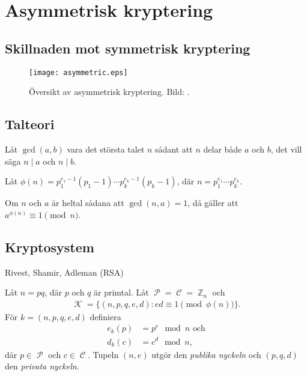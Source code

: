 \documentclass{beamer}
\theoremstyle{definition}
\DeclareMathOperator{\p}{\mathcal{P}}
\let\P\p
\DeclareMathOperator{\C}{\mathcal{C}}
\DeclareMathOperator{\K}{\mathcal{K}}
\DeclareMathOperator{\Z}{\mathbb{Z}}
\let\stoch\mathbf
\renewcommand{\p}{\stoch P}
\begin{document}
\section{Asymmetrisk kryptering}

\subsection{Skillnaden mot symmetrisk kryptering}

\begin{frame}{\insertsubsectionhead}
  \begin{figure}
    \texttt{[image: asymmetric.eps]}
    \caption{Översikt av asymmetrisk kryptering.
    Bild: \cite{Stallings2011can}.}
  \end{figure}
\end{frame}

\subsection{Talteori}

\begin{frame}{\insertsubsectionhead}
  \begin{definition}
    Låt \(\gcd(a, b)\) vara det största talet \(n\) sådant att \(n\) delar både 
    \(a\) och \(b\), det vill säga \(n\mid a\) och \(n\mid b\).
  \end{definition}
  \begin{definition}
    Låt \(\phi(n) = p_1^{e_1-1}(p_1 - 1)\cdots p_k^{e_k-1}(p_k - 1)\), där \(n 
    = p_1^{e_1}\cdots p_k^{e_k}\).
  \end{definition}
  \begin{theorem}
    Om \(n\) och \(a\) är heltal sådana att \(\gcd(n, a) = 1\), då gäller att 
    \(a^{\phi(n)}\equiv 1\pmod n\).
  \end{theorem}
\end{frame}

\subsection{Kryptosystem}

\begin{frame}{\insertsubsectionhead}{Rivest, Shamir, Adleman (RSA)}
  \begin{definition}
    Låt \(n = pq\), där \(p\) och \(q\) är primtal.
    Låt \(\P = \C = \Z_n\) och
    \begin{align*}
      \K = \{ (n, p, q, e, d)\colon ed\equiv 1\pmod{\phi(n)}\}.
    \end{align*}
    För \(k = (n, p, q, e, d)\) definiera
    \begin{align*}
      e_k(p) &= p^e\mod n \text{ och} \\
      d_k(c) &= c^d\mod n,
    \end{align*}
    där \(p\in \P\) och \(c\in \C\).
    Tupeln \((n, e)\) utgör den \emph{publika nyckeln} och \((p, q, d)\) den 
    \emph{privata nyckeln}.
  \end{definition}
\end{frame}
\end{document}
